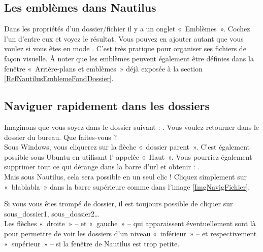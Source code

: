 \subsection{Les emblèmes dans Nautilus}
Dans les propriétés d'un dossier/fichier il y a un onglet «~Emblèmes~». Cochez l'un d'entre eux et voyez le résultat. Vous pouvez en ajouter autant que vous voulez si vous êtes en mode . C'est très pratique pour organiser ses fichiers de façon visuelle. À noter que les emblèmes peuvent également être définies dans la fenêtre «~Arrière-plans et emblèmes~» déjà exposée à la section \ref{RefNautilusEmblemeFondDossier}.
\subsection{Naviguer rapidement dans les dossiers}
Imaginons que vous soyez dans le dossier suivant : . Vous voulez retourner dans le dossier  du bureau. Que faites-vous ? \\
Sous Windows, vous cliquerez sur la flèche «~dossier parent~». C'est également possible sous Ubuntu en utilisant l' appelée «~Haut~». Vous pourriez également supprimer tout ce qui dérange dans la barre d'url et obtenir : .\\
Mais sous Nautilus, cela sera possible en un seul clic ! Cliquez simplement sur «~blablabla~» dans la barre supérieure comme dans l'image \ref{ImgNavigFichier}.\par
{}
Si vous vous êtes trompé de dossier, il est toujours possible de cliquer sur sous\_dossier1, sous\_dossier2\ldots{}\\
Les flèches «~droite~» -- et «~gauche~» -- qui apparaissent éventuellement sont là pour permettre de voir les dossiers d'un niveau «~inférieur~» -- et respectivement «~supérieur~» -- si la fenêtre de Nautilus est trop petite.\par
{}
